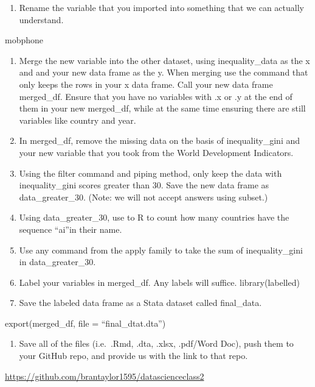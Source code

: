 \documentclass[
]{article}
\providecommand{\tightlist}{%
  \setlength{\itemsep}{0pt}\setlength{\parskip}{0pt}}
\begin{document}
\begin{enumerate}
\def\labelenumi{\arabic{enumi}.}
\setcounter{enumi}{15}
\tightlist
\item
  Rename the variable that you imported into something that we can
  actually understand.
\end{enumerate}

mobphone

\begin{enumerate}
\def\labelenumi{\arabic{enumi}.}
\setcounter{enumi}{16}
\item
  Merge the new variable into the other dataset, using inequality\_data
  as the x and and your new data frame as the y. When merging use the
  command that only keeps the rows in your x data frame. Call your new
  data frame merged\_df. Ensure that you have no variables with .x or .y
  at the end of them in your new merged\_df, while at the same time
  ensuring there are still variables like country and year.
\item
  In merged\_df, remove the missing data on the basis of
  inequality\_gini and your new variable that you took from the World
  Development Indicators.
\item
  Using the filter command and piping method, only keep the data with
  inequality\_gini scores greater than 30. Save the new data frame as
  data\_greater\_30. (Note: we will not accept answers using subset.)
\item
  Using data\_greater\_30, use to R to count how many countries have the
  sequence ``ai''in their name.
\item
  Use any command from the apply family to take the sum of
  inequality\_gini in data\_greater\_30.
\item
  Label your variables in merged\_df. Any labels will suffice.
  library(labelled)
\item
  Save the labeled data frame as a Stata dataset called final\_data.
\end{enumerate}

export(merged\_df, file = ``final\_dtat.dta'')

\begin{enumerate}
\def\labelenumi{\arabic{enumi}.}
\setcounter{enumi}{23}
\tightlist
\item
  Save all of the files (i.e.~.Rmd, .dta, .xlsx, .pdf/Word Doc), push
  them to your GitHub repo, and provide us with the link to that repo.
\end{enumerate}

\url{https://github.com/brantaylor1595/datascienceclass2}
\end{document}
